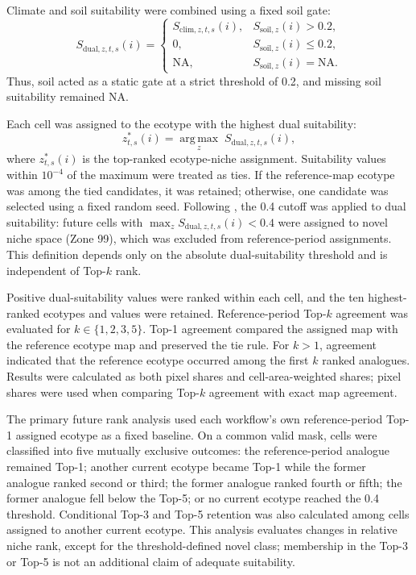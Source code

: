 \documentclass[11pt]{article}
\begin{document}
Climate and soil suitability were combined using a fixed soil gate:
\begin{equation}
S_{\mathrm{dual},z,t,s}(i)=
\begin{cases}
S_{\mathrm{clim},z,t,s}(i), & S_{\mathrm{soil},z}(i)>0.2,\\
0, & S_{\mathrm{soil},z}(i)\leq 0.2,\\
\mathrm{NA}, & S_{\mathrm{soil},z}(i)=\mathrm{NA}.
\end{cases}
\end{equation}
Thus, soil acted as a static gate at a strict threshold of 0.2, and missing soil suitability remained NA.

Each cell was assigned to the ecotype with the highest dual suitability:
\begin{equation}
z^*_{t,s}(i)=\underset{z}{\operatorname{arg\,max}}\;S_{\mathrm{dual},z,t,s}(i),
\end{equation}
where $z^*_{t,s}(i)$ is the top-ranked ecotype-niche assignment. Suitability
values within $10^{-4}$ of the maximum were treated as ties. If the
reference-map ecotype was among the tied candidates, it was retained;
otherwise, one candidate was selected using a fixed random seed. Following
\citet{wangCampbell2026}, the 0.4 cutoff was applied to dual suitability:
future cells with $\max_z S_{\mathrm{dual},z,t,s}(i)<0.4$ were assigned to
novel niche space (Zone 99), which was excluded from reference-period
assignments. This definition depends only on the absolute dual-suitability
threshold and is independent of Top-$k$ rank.

Positive dual-suitability values were ranked within each cell, and the ten
highest-ranked ecotypes and values were retained. Reference-period Top-$k$
agreement was evaluated for $k\in\{1,2,3,5\}$. Top-1 agreement compared the
assigned map with the reference ecotype map and preserved the tie rule. For
$k>1$, agreement indicated that the reference ecotype occurred among the first
$k$ ranked analogues. Results were calculated as both pixel shares and
cell-area-weighted shares; pixel shares were used when comparing Top-$k$
agreement with exact map agreement.

The primary future rank analysis used each workflow's own reference-period
Top-1 assigned ecotype as a fixed baseline. On a common valid mask, cells were
classified into five mutually exclusive outcomes: the reference-period
analogue remained Top-1; another current ecotype became Top-1 while the former
analogue ranked second or third; the former analogue ranked fourth or fifth;
the former analogue fell below the Top-5; or no current ecotype reached the
0.4 threshold. Conditional Top-3 and Top-5 retention was also calculated among
cells assigned to another current ecotype. This analysis evaluates changes in
relative niche rank, except for the threshold-defined novel class; membership
in the Top-3 or Top-5 is not an additional claim of adequate suitability.
\end{document}
